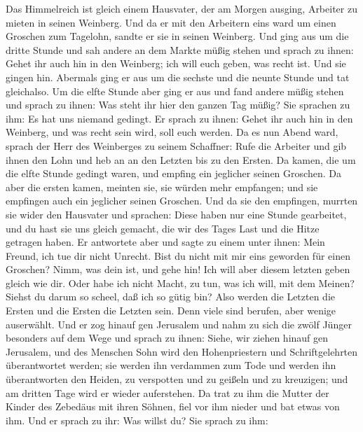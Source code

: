  Das Himmelreich ist gleich einem Hausvater, der am Morgen
ausging, Arbeiter zu mieten in seinen Weinberg.  Und da er
mit den Arbeitern eins ward um einen Groschen zum Tagelohn, sandte er
sie in seinen Weinberg.  Und ging aus um die dritte Stunde
und sah andere an dem Markte müßig stehen  und sprach zu
ihnen: Gehet ihr auch hin in den Weinberg; ich will euch geben, was
recht ist.  Und sie gingen hin. Abermals ging er aus um die
sechste und die neunte Stunde und tat gleichalso.  Um die
elfte Stunde aber ging er aus und fand andere müßig stehen und sprach zu
ihnen: Was steht ihr hier den ganzen Tag müßig?  Sie
sprachen zu ihm: Es hat uns niemand gedingt. Er sprach zu ihnen: Gehet
ihr auch hin in den Weinberg, und was recht sein wird, soll euch werden.
 Da es nun Abend ward, sprach der Herr des Weinberges zu
seinem Schaffner: Rufe die Arbeiter und gib ihnen den Lohn und heb an an
den Letzten bis zu den Ersten.  Da kamen, die um die elfte
Stunde gedingt waren, und empfing ein jeglicher seinen Groschen.
 Da aber die ersten kamen, meinten sie, sie würden mehr
empfangen; und sie empfingen auch ein jeglicher seinen Groschen.
 Und da sie den empfingen, murrten sie wider den Hausvater
 und sprachen: Diese haben nur eine Stunde gearbeitet, und
du hast sie uns gleich gemacht, die wir des Tages Last und die Hitze
getragen haben.  Er antwortete aber und sagte zu einem
unter ihnen: Mein Freund, ich tue dir nicht Unrecht. Bist du nicht mit
mir eins geworden für einen Groschen?  Nimm, was dein ist,
und gehe hin! Ich will aber diesem letzten geben gleich wie dir.
 Oder habe ich nicht Macht, zu tun, was ich will, mit dem
Meinen? Siehst du darum so scheel, daß ich so gütig bin? 
Also werden die Letzten die Ersten und die Ersten die Letzten sein. Denn
viele sind berufen, aber wenige auserwählt.  Und er zog
hinauf gen Jerusalem und nahm zu sich die zwölf Jünger besonders auf dem
Wege und sprach zu ihnen:  Siehe, wir ziehen hinauf gen
Jerusalem, und des Menschen Sohn wird den Hohenpriestern und
Schriftgelehrten überantwortet werden; sie werden ihn verdammen zum Tode
 und werden ihn überantworten den Heiden, zu verspotten und
zu geißeln und zu kreuzigen; und am dritten Tage wird er wieder
auferstehen.  Da trat zu ihm die Mutter der Kinder des
Zebedäus mit ihren Söhnen, fiel vor ihm nieder und bat etwas von ihm.
 Und er sprach zu ihr: Was willst du? Sie sprach zu ihm:
